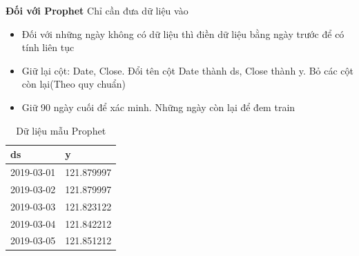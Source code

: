 \textbf{Đối với Prophet}
Chỉ cần đưa dữ liệu vào
\begin{itemize}
    \item Đối với những ngày không có dữ liệu thì điền dữ liệu bằng ngày trước để có tính liên tục \\
    \item Giữ lại cột: Date, Close. Đổi tên cột Date thành ds, Close thành y. Bỏ các cột còn lại(Theo quy chuẩn) \\
    \item Giữ 90 ngày cuối để xác minh. Những ngày còn lại để đem train \\
\end{itemize}
\begin{table}[h]
	\begin{tabularx}{\textwidth}{X | X } 
		ds	& y	  \\ \hline
		2019-03-01	& 121.879997 \\ \hline
		2019-03-02	& 121.879997 \\ \hline
		2019-03-03	& 121.823122 \\ \hline
		2019-03-04	& 121.842212 \\ \hline
		2019-03-05	& 121.851212 \\ %
	\end{tabularx}
	\label{tab:data_prophet}
	\caption{Dữ liệu mẫu Prophet}
\end{table}

